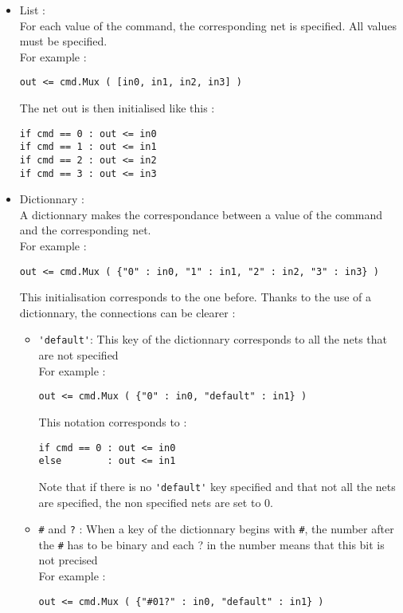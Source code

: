 \begin{itemize}
    \item List :\\
    \indent For each value of the command, the corresponding net is specified. All values must be specified.\\
    \indent For example :
    \begin{verbatim}
out <= cmd.Mux ( [in0, in1, in2, in3] )
    \end{verbatim}
    \indent The net out is then initialised like this :
    \begin{verbatim}
if cmd == 0 : out <= in0
if cmd == 1 : out <= in1
if cmd == 2 : out <= in2
if cmd == 3 : out <= in3
    \end{verbatim}
    \item Dictionnary :\\
    \indent A dictionnary makes the correspondance between a value of the command and the corresponding net.\\
    \indent For example :
    \begin{verbatim}
out <= cmd.Mux ( {"0" : in0, "1" : in1, "2" : in2, "3" : in3} )
    \end{verbatim}
    \indent This initialisation corresponds to the one before.
    \indent Thanks to the use of a dictionnary, the connections can be clearer :
    \begin{itemize}
        \item \verb-'default'-: This key of the dictionnary corresponds to all the nets that are not specified\\
        For example :
        \begin{verbatim}
out <= cmd.Mux ( {"0" : in0, "default" : in1} )
        \end{verbatim}
        This notation corresponds to :
        \begin{verbatim}
if cmd == 0 : out <= in0
else        : out <= in1
        \end{verbatim}
        Note that if there is no \verb-'default'- key specified and that not all the nets are specified, the non specified nets are set to 0.
        \item \verb-#- and \verb-?- : When a key of the dictionnary begins with \verb-#-, the number after the \verb-#- has to be binary and each ? in the number means that this bit is not precised\\
        For example :
        \begin{verbatim}
out <= cmd.Mux ( {"#01?" : in0, "default" : in1} )

\end{verbatim}
\end{itemize}
\end{itemize}
